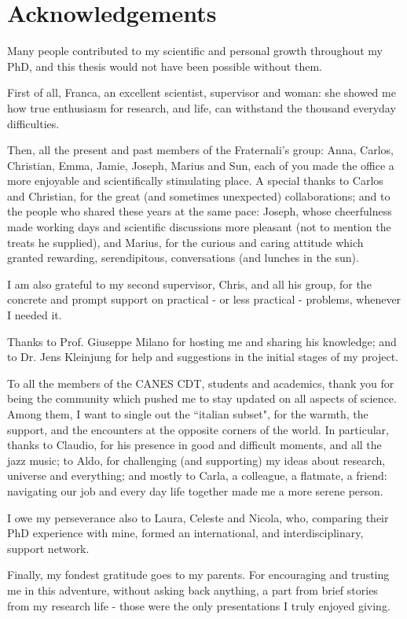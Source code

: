 \chapter*{Acknowledgements}
%
\begin{onehalfspacing}
Many people contributed to my scientific and personal growth throughout my PhD, and this thesis would not have been possible without them.

First of all, Franca, an excellent scientist, supervisor and woman: she showed me how true enthusiasm for research, and life, can withstand the thousand everyday difficulties.

Then, all the present and past members of the Fraternali's group: Anna, Carlos, Christian, Emma, Jamie, Joseph, Marius and Sun, each of you made the office a more enjoyable and scientifically stimulating place. A special thanks to Carlos and Christian, for the great (and sometimes unexpected) collaborations; and to the people who shared these years at the same pace: Joseph, whose cheerfulness made working days and scientific discussions more pleasant (not to mention the treats he supplied), and Marius, for the curious and caring attitude which granted rewarding, serendipitous, conversations (and lunches in the sun).

I am also grateful to my second supervisor, Chris, and all his group, for the concrete and prompt support on practical - or less practical - problems, whenever I needed it.

Thanks to Prof. Giuseppe Milano for hosting me and sharing his knowledge; and to Dr. Jens Kleinjung for help and suggestions in the initial stages of my project.

To all the members of the CANES CDT, students and academics, thank you for being the community which pushed me to stay updated on all aspects of science. Among them, I want to single out the ``italian subset", for the warmth, the support, and the encounters at the opposite corners of the world. In particular, thanks to Claudio, for his presence in good and difficult moments, and all the jazz music; to Aldo, for challenging (and supporting) my ideas about research, universe and everything; and mostly to Carla, a colleague, a flatmate, a friend: navigating our job and every day life together made me a more serene person.

I owe my perseverance also to Laura, Celeste and Nicola, who, comparing their PhD experience with mine, formed an international, and interdisciplinary, support network.

Finally, my fondest gratitude goes to my parents. For encouraging and trusting me in this adventure, without asking back anything, a part from brief stories from my research life - those were the only presentations I truly enjoyed giving.

\end{onehalfspacing}


